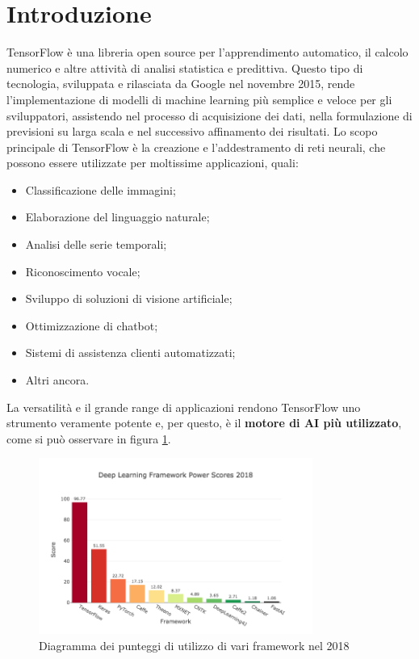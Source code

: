 \section{Introduzione}
TensorFlow\cite{tensorflow} è una libreria open source per l'apprendimento automatico, il calcolo numerico e altre attività di analisi statistica e predittiva. Questo
tipo di tecnologia, sviluppata e rilasciata da Google nel novembre 2015, rende l’implementazione di modelli di machine learning più semplice e veloce per
gli sviluppatori, assistendo nel processo di acquisizione dei dati, nella formulazione di previsioni su larga scala e nel successivo affinamento dei risultati.
Lo scopo principale di TensorFlow è la creazione e l’addestramento di reti neurali, che possono essere utilizzate per moltissime applicazioni, quali:
\begin{itemize}
    \item Classificazione delle immagini;
    \item Elaborazione del linguaggio naturale;
    \item Analisi delle serie temporali;
    \item Riconoscimento vocale;
    \item Sviluppo di soluzioni di visione artificiale;
    \item Ottimizzazione di chatbot;
    \item Sistemi di assistenza clienti automatizzati;
    \item Altri ancora.
\end{itemize}

La versatilità e il grande range di applicazioni rendono TensorFlow uno strumento veramente potente e, per questo, è il \textbf{motore di AI più utilizzato},
come si può osservare in figura \ref{fig:diagramma}.

\begin{figure}[ht]
    \centering
    \includegraphics[width=0.8\textwidth]{Immagini/diagramma.png}
    \caption{Diagramma dei punteggi di utilizzo di vari framework nel 2018}
    \label{fig:diagramma}
\end{figure}

